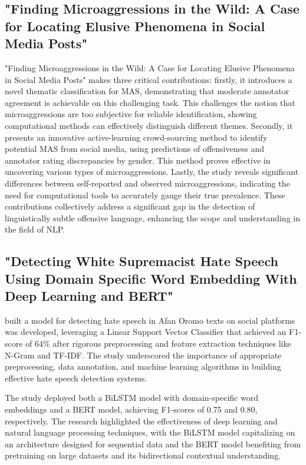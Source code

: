\documentclass[11pt]{article}
\begin{document}
\subsection{"Finding Microaggressions in the Wild: A Case for Locating Elusive Phenomena in Social Media Posts"}


"Finding Microaggressions in the Wild: A Case for Locating Elusive Phenomena in Social Media Posts" \cite{breitfeller2019microaggressions} makes three critical contributions: firstly, it introduces a novel thematic classification for MAS, demonstrating that moderate annotator agreement is achievable on this challenging task. This challenges the notion that microaggressions are too subjective for reliable identification, showing computational methods can effectively distinguish different themes. Secondly, it presents an innovative active-learning crowd-sourcing method to identify potential MAS from social media, using predictions of offensiveness and annotator rating discrepancies by gender. This method proves effective in uncovering various types of microaggressions. Lastly, the study reveals significant differences between self-reported and observed microaggressions, indicating the need for computational tools to accurately gauge their true prevalence. These contributions collectively address a significant gap in the detection of linguistically subtle offensive language, enhancing the scope and understanding in the field of NLP.
\subsection{"Detecting White Supremacist Hate Speech Using Domain Specific Word Embedding With Deep Learning and BERT"}
\cite{defersha2021detection} built a model for detecting hate speech in Afan Oromo texts on social platforms was developed, leveraging a Linear Support Vector Classifier that achieved an F1-score of 64\% after rigorous preprocessing and feature extraction techniques like N-Gram and TF-IDF. The study underscored the importance of appropriate preprocessing, data annotation, and machine learning algorithms in building effective hate speech detection systems.

The study deployed both a BiLSTM model with domain-specific word embeddings and a BERT model, achieving F1-scores of 0.75 and 0.80, respectively. The research highlighted the effectiveness of deep learning and natural language processing techniques, with the BiLSTM model capitalizing on an architecture designed for sequential data and the BERT model benefiting from pretraining on large datasets and its bidirectional contextual understanding.
\end{document}
